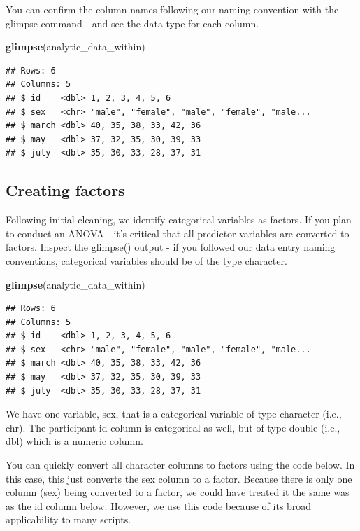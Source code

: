 \documentclass[
]{krantz}
\makeatletter
\newenvironment{Shaded}{\begin{snugshade}}{\end{snugshade}}
\newcommand{\KeywordTok}[1]{\textcolor[rgb]{0.27,0.27,0.27}{\textbf{#1}}}
\newcommand{\NormalTok}[1]{#1}
\newenvironment{kframe}{%
\medskip{}
\setlength{\fboxsep}{.8em}
 \def\at@end@of@kframe{}%
 \ifinner\ifhmode%
  \def\at@end@of@kframe{\end{minipage}}%
  \begin{minipage}{\columnwidth}%
 \fi\fi%
 \def\FrameCommand##1{\hskip\@totalleftmargin \hskip-\fboxsep
 \colorbox{shadecolor}{##1}\hskip-\fboxsep
     \hskip-\linewidth \hskip-\@totalleftmargin \hskip\columnwidth}%
 \MakeFramed {\advance\hsize-\width
   \@totalleftmargin\z@ \linewidth\hsize
   \@setminipage}}%
 {\par\unskip\endMakeFramed%
 \at@end@of@kframe}
\renewenvironment{Shaded}{\begin{kframe}}{\end{kframe}}
\makeatother
\begin{document}
You can confirm the column names following our naming convention with the glimpse command - and see the data type for each column.

\begin{Shaded}
\begin{Highlighting}[]
\KeywordTok{glimpse}\NormalTok{(analytic_data_within)}
\end{Highlighting}
\end{Shaded}

\begin{verbatim}
## Rows: 6
## Columns: 5
## $ id    <dbl> 1, 2, 3, 4, 5, 6
## $ sex   <chr> "male", "female", "male", "female", "male...
## $ march <dbl> 40, 35, 38, 33, 42, 36
## $ may   <dbl> 37, 32, 35, 30, 39, 33
## $ july  <dbl> 35, 30, 33, 28, 37, 31
\end{verbatim}

\hypertarget{creating-factors-1}{%
\subsection{Creating factors}\label{creating-factors-1}}

Following initial cleaning, we identify categorical variables as factors. If you plan to conduct an ANOVA - it's critical that all predictor variables are converted to factors. Inspect the glimpse() output - if you followed our data entry naming conventions, categorical variables should be of the type character.

\begin{Shaded}
\begin{Highlighting}[]
\KeywordTok{glimpse}\NormalTok{(analytic_data_within)}
\end{Highlighting}
\end{Shaded}

\begin{verbatim}
## Rows: 6
## Columns: 5
## $ id    <dbl> 1, 2, 3, 4, 5, 6
## $ sex   <chr> "male", "female", "male", "female", "male...
## $ march <dbl> 40, 35, 38, 33, 42, 36
## $ may   <dbl> 37, 32, 35, 30, 39, 33
## $ july  <dbl> 35, 30, 33, 28, 37, 31
\end{verbatim}

We have one variable, sex, that is a categorical variable of type character (i.e., chr). The participant id column is categorical as well, but of type double (i.e., dbl) which is a numeric column.

You can quickly convert all character columns to factors using the code below. In this case, this just converts the sex column to a factor. Because there is only one column (sex) being converted to a factor, we could have treated it the same was as the id column below. However, we use this code because of its broad applicability to many scripts.
\end{document}
